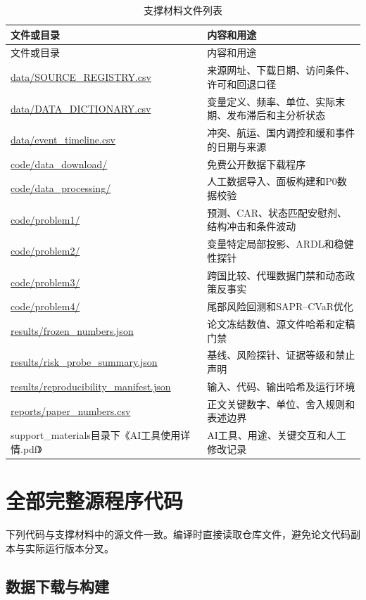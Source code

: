 \begin{appendices}
\footnotesize
\begin{longtable}{p{}p{}}
  \caption{支撑材料文件列表}\label{tab:support-files}\\
  \toprule
  文件或目录 & 内容和用途 \\
  \midrule
  \endfirsthead
  \toprule
  文件或目录 & 内容和用途 \\
  \midrule
  \endhead
  \url{data/SOURCE_REGISTRY.csv} & 来源网址、下载日期、访问条件、许可和回退口径 \\
  \url{data/DATA_DICTIONARY.csv} & 变量定义、频率、单位、实际末期、发布滞后和主分析状态 \\
  \url{data/event_timeline.csv} & 冲突、航运、国内调控和缓和事件的日期与来源 \\
  \url{code/data_download/} & 免费公开数据下载程序 \\
  \url{code/data_processing/} & 人工数据导入、面板构建和P0数据校验 \\
  \url{code/problem1/} & 预测、CAR、状态匹配安慰剂、结构冲击和条件波动 \\
  \url{code/problem2/} & 变量特定局部投影、ARDL和稳健性探针 \\
  \url{code/problem3/} & 跨国比较、代理数据门禁和动态政策反事实 \\
  \url{code/problem4/} & 尾部风险回测和SAPR--CVaR优化 \\
  \url{results/frozen_numbers.json} & 论文冻结数值、源文件哈希和定稿门禁 \\
  \url{results/risk_probe_summary.json} & 基线、风险探针、证据等级和禁止声明 \\
  \url{results/reproducibility_manifest.json} & 输入、代码、输出哈希及运行环境 \\
  \url{reports/paper_numbers.csv} & 正文关键数字、单位、舍入规则和表述边界 \\
  support\_materials目录下《AI工具使用详情.pdf》 & AI工具、用途、关键交互和人工修改记录 \\
  \bottomrule
\end{longtable}
\normalsize

\section{全部完整源程序代码}

下列代码与支撑材料中的源文件一致。编译时直接读取仓库文件，避免论文代码副本与实际运行版本分叉。
\lstset{basicstyle=\ttfamily\tiny,breaklines=true,numbers=left,numbersep=4pt}

\subsection{数据下载与构建}







\end{appendices}
